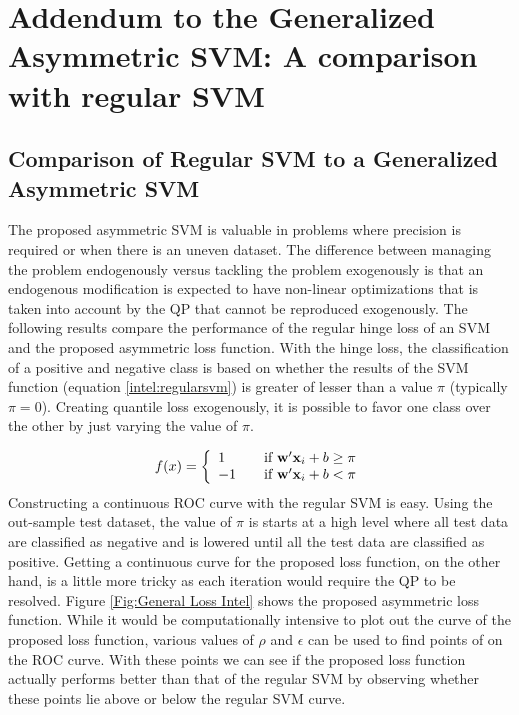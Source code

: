 \section{Addendum to the Generalized Asymmetric SVM: A comparison with regular SVM}

\subsection{Comparison of Regular SVM to a Generalized Asymmetric SVM}
The proposed asymmetric SVM is valuable in problems where precision is required or when there is an uneven dataset. The difference between managing the problem endogenously versus tackling the problem exogenously is that an endogenous modification is expected to have non-linear optimizations that is taken into account by the QP that cannot be reproduced exogenously. The following results compare the performance of the regular hinge loss of an SVM and the proposed asymmetric loss function. With the hinge loss, the classification of a positive and negative class is based on whether the results of the SVM function (equation \ref{intel:regularsvm}) is greater of lesser than a value $\pi$ (typically $\pi=0$). Creating quantile loss exogenously, it is possible to favor one class over the other by just varying the value of $\pi$. 

	\begin{equation}\label{intel:regularsvm}
	f(x)=\left\{ 
		\begin{array}{l l}
		  1 & \quad \mbox{if $\mathbf{w}'\mathbf{x}_i+b \geq \pi$}\\
		  -1 & \quad \mbox{if $\mathbf{w}'\mathbf{x}_i+b < \pi$}\\ \end{array} \right.
	\end{equation}
	Constructing a continuous ROC curve with the regular SVM is easy. Using the out-sample test dataset, the value of $\pi$ is starts at a high level where all test data are classified as negative and is lowered until all the test data are classified as positive. Getting a continuous curve for the proposed loss function, on the other hand, is a little more tricky as each iteration would require the QP to be resolved. Figure \ref{Fig:General Loss Intel} shows the proposed asymmetric loss function. While it would be computationally intensive to plot out the curve of the proposed loss function, various values of $\rho$ and $\epsilon$ can be used to find points of on the ROC curve. With these points we can see if the proposed loss function actually performs better than that of the regular SVM by observing whether these points lie above or below the regular SVM curve. 

